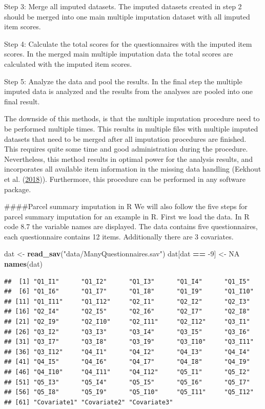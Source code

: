 \documentclass[
]{book}
\newenvironment{Shaded}{\begin{snugshade}}{\end{snugshade}}
\newcommand{\DecValTok}[1]{\textcolor[rgb]{0.00,0.00,0.81}{#1}}
\newcommand{\KeywordTok}[1]{\textcolor[rgb]{0.13,0.29,0.53}{\textbf{#1}}}
\newcommand{\NormalTok}[1]{#1}
\newcommand{\OperatorTok}[1]{\textcolor[rgb]{0.81,0.36,0.00}{\textbf{#1}}}
\newcommand{\OtherTok}[1]{\textcolor[rgb]{0.56,0.35,0.01}{#1}}
\newcommand{\StringTok}[1]{\textcolor[rgb]{0.31,0.60,0.02}{#1}}
\begin{document}
Step 3: Merge all imputed datasets. The imputed datasets created in step
2 should be merged into one main multiple imputation dataset with all
imputed item scores.

Step 4: Calculate the total scores for the questionnaires with the
imputed item scores. In the merged main multiple imputation data the
total scores are calculated with the imputed item scores.

Step 5: Analyze the data and pool the results. In the final step the
multiple imputed data is analyzed and the results from the analyses are
pooled into one final result.

The downside of this methods, is that the multiple imputation procedure
need to be performed multiple times. This results in multiple files with
multiple imputed datasets that need to be merged after all imputation
procedures are finished. This requires quite some time and good
administration during the procedure. Nevertheless, this method results
in optimal power for the analysis results, and incorporates all
available item information in the missing data handling (Eekhout et al.
(\protect\hyperlink{ref-Eekhout2018}{2018})). Furthermore, this
procedure can be performed in any software package.

\#\#\#\#Parcel summary imputation in R We will also follow the five
steps for parcel summary imputation for an example in R. First we load
the data. In R code 8.7 the variable names are displayed. The data
contains five questionnaires, each questionnaire contains 12 items.
Additionally there are 3 covariates.

\begin{Shaded}
\begin{Highlighting}[]
\NormalTok{dat <-}\StringTok{ }\KeywordTok{read_sav}\NormalTok{(}\StringTok{"data/ManyQuestionnaires.sav"}\NormalTok{)}
\NormalTok{dat[dat }\OperatorTok{==}\StringTok{ }\DecValTok{-9}\NormalTok{] <-}\StringTok{ }\OtherTok{NA}
\KeywordTok{names}\NormalTok{(dat)}
\end{Highlighting}
\end{Shaded}

\begin{verbatim}
##  [1] "Q1_I1"      "Q1_I2"      "Q1_I3"      "Q1_I4"      "Q1_I5"     
##  [6] "Q1_I6"      "Q1_I7"      "Q1_I8"      "Q1_I9"      "Q1_I10"    
## [11] "Q1_I11"     "Q1_I12"     "Q2_I1"      "Q2_I2"      "Q2_I3"     
## [16] "Q2_I4"      "Q2_I5"      "Q2_I6"      "Q2_I7"      "Q2_I8"     
## [21] "Q2_I9"      "Q2_I10"     "Q2_I11"     "Q2_I12"     "Q3_I1"     
## [26] "Q3_I2"      "Q3_I3"      "Q3_I4"      "Q3_I5"      "Q3_I6"     
## [31] "Q3_I7"      "Q3_I8"      "Q3_I9"      "Q3_I10"     "Q3_I11"    
## [36] "Q3_I12"     "Q4_I1"      "Q4_I2"      "Q4_I3"      "Q4_I4"     
## [41] "Q4_I5"      "Q4_I6"      "Q4_I7"      "Q4_I8"      "Q4_I9"     
## [46] "Q4_I10"     "Q4_I11"     "Q4_I12"     "Q5_I1"      "Q5_I2"     
## [51] "Q5_I3"      "Q5_I4"      "Q5_I5"      "Q5_I6"      "Q5_I7"     
## [56] "Q5_I8"      "Q5_I9"      "Q5_I10"     "Q5_I11"     "Q5_I12"    
## [61] "Covariate1" "Covariate2" "Covariate3"
\end{verbatim}
\end{document}
